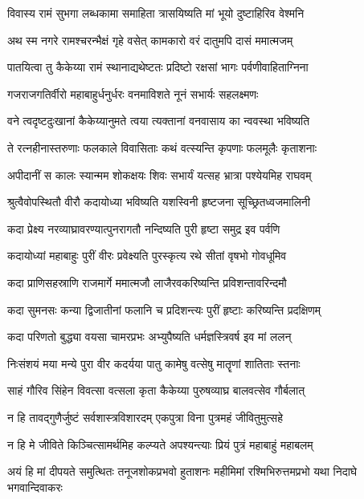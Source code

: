 \twolineshloka
{विवास्य रामं सुभगा लब्धकामा समाहिता}
{त्रासयिष्यति मां भूयो दुष्टाहिरिव वेश्मनि} %

\twolineshloka
{अथ स्म नगरे रामश्चरन्भैक्षं गृहे वसेत्}
{कामकारो वरं दातुमपि दासं ममात्मजम्} %

\twolineshloka
{पातयित्वा तु कैकेय्या रामं स्थानाद्यथेष्टतः}
{प्रदिष्टो रक्षसां भागः पर्वणीवाहिताग्निना} %

\twolineshloka
{गजराजगतिर्वीरो महाबाहुर्धनुर्धरः}
{वनमाविशते नूनं सभार्यः सहलक्ष्मणः} %

\twolineshloka
{वने त्वदृष्टदुःखानां कैकेय्यानुमते त्वया}
{त्यक्तानां वनवासाय का न्ववस्था भविष्यति} %

\twolineshloka
{ते रत्नहीनास्तरुणाः फलकाले विवासिताः}
{कथं वत्स्यन्ति कृपणाः फलमूलैः कृताशनाः} %

\twolineshloka
{अपीदानीं स कालः स्यान्मम शोकक्षयः शिवः}
{सभार्यं यत्सह भ्रात्रा पश्येयमिह राघवम्} %

\twolineshloka
{श्रुत्वैवोपस्थितौ वीरौ कदायोध्या भविष्यति}
{यशस्विनी हृष्टजना सूच्छ्रितध्वजमालिनी} %

\twolineshloka
{कदा प्रेक्ष्य नरव्याघ्रावरण्यात्पुनरागतौ}
{नन्दिष्यति पुरी हृष्टा समुद्र इव पर्वणि} %

\twolineshloka
{कदायोध्यां महाबाहुः पुरीं वीरः प्रवेक्ष्यति}
{पुरस्कृत्य रथे सीतां वृषभो गोवधूमिव} %

\twolineshloka
{कदा प्राणिसहस्राणि राजमार्गे ममात्मजौ}
{लाजैरवकरिष्यन्ति प्रविशन्तावरिन्दमौ} %

\twolineshloka
{कदा सुमनसः कन्या द्विजातीनां फलानि च}
{प्रदिशन्त्यः पुरीं हृष्टाः करिष्यन्ति प्रदक्षिणम्} %

\twolineshloka
{कदा परिणतो बुद्ध्या वयसा चामरप्रभः}
{अभ्युपैष्यति धर्मज्ञस्त्रिवर्ष इव मां ललन्} %

\twolineshloka
{निःसंशयं मया मन्ये पुरा वीर कदर्यया}
{पातु कामेषु वत्सेषु मातॄणां शातिताः स्तनाः} %

\twolineshloka
{साहं गौरिव सिंहेन विवत्सा वत्सला कृता}
{कैकेय्या पुरुषव्याघ्र बालवत्सेव गौर्बलात्} %

\twolineshloka
{न हि तावद्गुणैर्जुष्टं सर्वशास्त्रविशारदम्}
{एकपुत्रा विना पुत्रमहं जीवितुमुत्सहे} %

\twolineshloka
{न हि मे जीविते किञ्चित्सामर्थमिह कल्प्यते}
{अपश्यन्त्याः प्रियं पुत्रं महाबाहुं महाबलम्} %

\fourlineindentedshloka
{अयं हि मां दीपयते समुत्थितः}
{तनूजशोकप्रभवो हुताशनः}
{महीमिमां रश्मिभिरुत्तमप्रभो}
{यथा निदाघे भगवान्दिवाकरः} %


